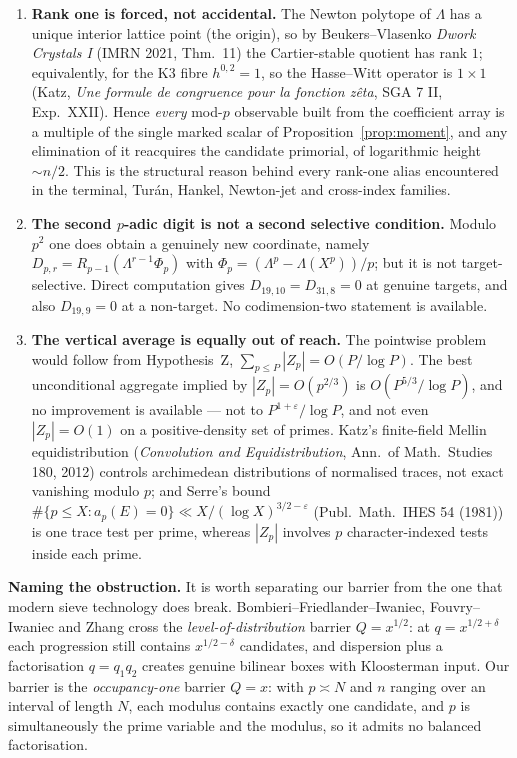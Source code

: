 \begin{enumerate}
\item \textbf{Rank one is forced, not accidental.}  The Newton polytope of $\Lambda$ has a
unique interior lattice point (the origin), so by Beukers--Vlasenko \emph{Dwork Crystals I}
(IMRN 2021, Thm.~11) the Cartier-stable quotient has rank $1$; equivalently, for the K3
fibre $h^{0,2}=1$, so the Hasse--Witt operator is $1\times1$ (Katz, \emph{Une formule de
congruence pour la fonction z\^eta}, SGA 7 II, Exp.~XXII).  Hence \emph{every} mod-$p$
observable built from the coefficient array is a multiple of the single marked scalar of
Proposition~\ref{prop:moment}, and any elimination of it reacquires the candidate primorial,
of logarithmic height $\sim n/2$.  This is the structural reason behind every rank-one alias
encountered in the terminal, Turán, Hankel, Newton-jet and cross-index families.

\item \textbf{The second $p$-adic digit is not a second selective condition.}  Modulo $p^2$
one does obtain a genuinely new coordinate, namely $D_{p,r}=R_{p-1}(\Lambda^{r-1}\Phi_p)$
with $\Phi_p=(\Lambda^p-\Lambda(X^p))/p$; but it is not target-selective.  Direct computation
gives $D_{19,10}=D_{31,8}=0$ at genuine targets, and also $D_{19,9}=0$ at a non-target.  No
codimension-two statement is available.

\item \textbf{The vertical average is equally out of reach.}  The pointwise problem would
follow from Hypothesis~Z, $\sum_{p\le P}|Z_p|=O(P/\log P)$.  The best unconditional aggregate
implied by $|Z_p|=O(p^{2/3})$ is $O(P^{5/3}/\log P)$, and no improvement is available — not to
$P^{1+\varepsilon}/\log P$, and not even $|Z_p|=O(1)$ on a positive-density set of primes.
Katz's finite-field Mellin equidistribution (\emph{Convolution and Equidistribution},
Ann.\ of Math.\ Studies 180, 2012) controls archimedean distributions of normalised traces,
not exact vanishing modulo $p$; and Serre's bound
$\#\{p\le X:a_p(E)=0\}\ll X/(\log X)^{3/2-\varepsilon}$
(Publ.\ Math.\ IHES 54 (1981)) is one trace test per prime, whereas $|Z_p|$ involves $p$
character-indexed tests inside each prime.
\end{enumerate}

\medskip
\noindent\textbf{Naming the obstruction.}  It is worth separating our barrier from the one that
modern sieve technology does break.  Bombieri--Friedlander--Iwaniec, Fouvry--Iwaniec and Zhang
cross the \emph{level-of-distribution} barrier $Q=x^{1/2}$: at $q=x^{1/2+\delta}$ each
progression still contains $x^{1/2-\delta}$ candidates, and dispersion plus a factorisation
$q=q_1q_2$ creates genuine bilinear boxes with Kloosterman input.  Our barrier is the
\emph{occupancy-one} barrier $Q=x$: with $p\asymp N$ and $n$ ranging over an interval of length
$N$, each modulus contains exactly one candidate, and $p$ is simultaneously the prime variable
and the modulus, so it admits no balanced factorisation.

